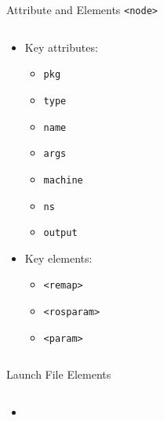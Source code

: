 \documentclass[aspectratio=43]{beamer}
\newcommand{\inline}[1]{\texttt{#1}}
\begin{document}
\begin{frame}{Attribute and Elements \texttt{<node>}}
	\begin{columns}
		\begin{column}{0.6\textwidth}
			\begin{itemize}
				\item Key attributes:
					\begin{itemize}
						\item \inline{pkg} 
						\item \inline{type} 
						\item \inline{name} 
						\item \inline{args} 
						\item \inline{machine} 
						\item \inline{ns} 
						\item \inline{output} 
					\end{itemize}
				\item Key elements:
					\begin{itemize}
						\item \inline{<remap>}
						\item \inline{<rosparam>}
						\item \inline{<param>}
					\end{itemize}
			\end{itemize}
		\end{column}
		\begin{column}{0.4\textwidth}
			\centering
		\end{column}
	\end{columns}
\end{frame}

\begin{frame}{Launch File Elements}
	\begin{columns}
		\begin{column}{0.6\textwidth}
			\begin{itemize}
				\item 
			\end{itemize}
		\end{column}
		\begin{column}{0.4\textwidth}
			\centering
		\end{column}
	\end{columns}
\end{frame}
\end{document}

